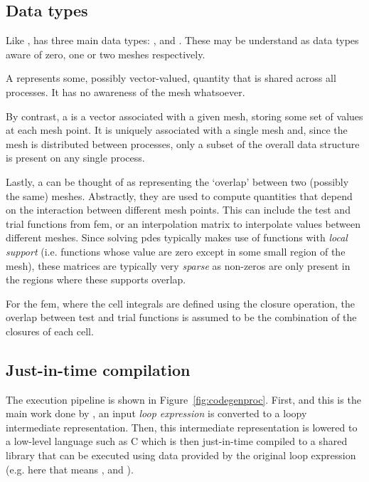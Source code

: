 \subsection{Data types}

Like ,  has three main data types: ,  and .
These may be understand as data types aware of zero, one or two meshes respectively.

A  represents some, possibly vector-valued, quantity that is shared across all processes.
It has no awareness of the mesh whatsoever.

By contrast, a  is a vector associated with a given mesh, storing some set of values at each mesh point.
It is uniquely associated with a single mesh and, since the mesh is distributed between processes, only a subset of the overall data structure is present on any single process.

Lastly, a  can be thought of as representing the `overlap' between two (possibly the same) meshes.
Abstractly, they are used to compute quantities that depend on the interaction between different mesh points.
This can include the test and trial functions from \gls{fem}, or an interpolation matrix to interpolate values between different meshes.
Since solving \glspl{pde} typically makes use of functions with \textit{local support} (i.e. functions whose value are zero except in some small region of the mesh), these matrices are typically very \textit{sparse} as non-zeros are only present in the regions where these supports overlap.

For the \gls{fem}, where the cell integrals are defined using the closure operation, the overlap between test and trial functions is assumed to be the combination of the closures of each cell.

\subsection{Just-in-time compilation}

The execution pipeline is shown in Figure~\ref{fig:codegenproc}.
First, and this is the main work done by , an input \textit{loop expression} is converted to a loopy intermediate representation.
Then, this intermediate representation is lowered to a low-level language such as C which is then just-in-time compiled to a shared library that can be executed using data provided by the original loop expression (e.g. here that means ,  and ).

